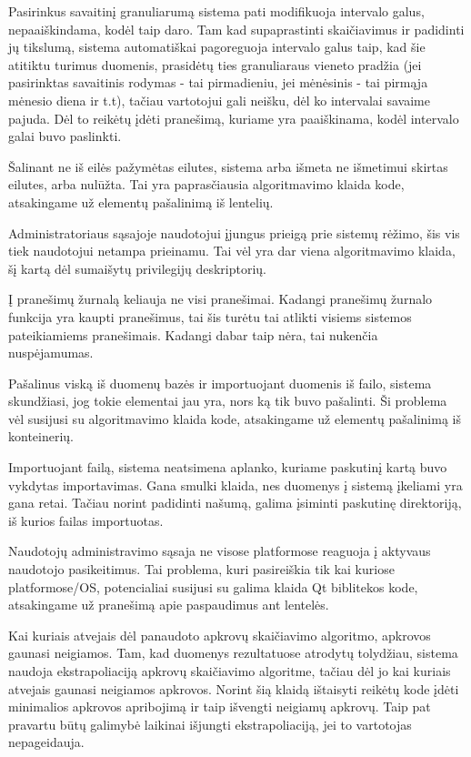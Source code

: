 {
  Pasirinkus savaitinį granuliarumą sistema pati modifikuoja intervalo galus,
  nepaaiškindama, kodėl taip daro.
}
{
  Tam kad supaprastinti skaičiavimus ir padidinti jų tikslumą, sistema automatiškai
  pagoreguoja intervalo galus taip, kad šie atitiktu turimus duomenis, prasidėtų ties 
  granuliaraus vieneto pradžia (jei pasirinktas savaitinis rodymas - tai pirmadieniu,
  jei mėnėsinis - tai pirmąja mėnesio diena ir t.t), tačiau vartotojui gali neišku, dėl
  ko intervalai savaime pajuda. Dėl to reikėtų įdėti pranešimą, kuriame yra paaiškinama,
  kodėl intervalo galai buvo paslinkti.
}

{
  Šalinant ne iš eilės pažymėtas eilutes, sistema arba išmeta ne išmetimui
  skirtas eilutes, arba nulūžta.
}
{
  Tai yra paprasčiausia algoritmavimo klaida kode, atsakingame už elementų pašalinimą
  iš lentelių.
}

{
  Administratoriaus sąsajoje naudotojui įjungus prieigą prie sistemų
  rėžimo, šis vis tiek naudotojui netampa prieinamu.
}
{
  Tai vėl yra dar viena algoritmavimo klaida, šį kartą dėl sumaišytų privilegijų deskriptorių.
}

{
  Į pranešimų žurnalą keliauja ne visi pranešimai.
}
{
  Kadangi pranešimų žurnalo funkcija yra kaupti pranešimus, tai šis turėtu tai atlikti
  visiems sistemos pateikiamiems pranešimais. Kadangi dabar taip nėra, tai nukenčia
  nuspėjamumas.
}

{
  Pašalinus viską iš duomenų bazės ir importuojant duomenis iš failo,
  sistema skundžiasi, jog tokie elementai jau yra, nors ką tik buvo pašalinti.
}
{
  Ši problema vėl susijusi su algoritmavimo klaida kode, atsakingame už elementų pašalinimą
  iš konteinerių.
}

{
  Importuojant failą, sistema neatsimena aplanko, kuriame paskutinį
  kartą buvo vykdytas importavimas.
}
{
  Gana smulki klaida, nes duomenys į sistemą įkeliami yra gana retai. Tačiau norint
  padidinti našumą, galima įsiminti paskutinę direktoriją, iš kurios failas importuotas.
}

{
  Naudotojų administravimo sąsaja ne visose platformose reaguoja į
  aktyvaus naudotojo pasikeitimus.
}
{
  Tai problema, kuri pasireiškia tik kai kuriose platformose/OS, potencialiai susijusi
  su galima klaida Qt biblitekos kode, atsakingame už pranešimą apie paspaudimus ant 
  lentelės.
}

{
  Kai kuriais atvejais dėl panaudoto apkrovų skaičiavimo algoritmo,
  apkrovos gaunasi neigiamos.
}
{
  Tam, kad duomenys rezultatuose atrodytų tolydžiau, sistema naudoja ekstrapoliaciją
  apkrovų skaičiavimo algoritme, tačiau dėl jo kai kuriais atvejais gaunasi neigiamos
  apkrovos. Norint šią klaidą ištaisyti reikėtų kode įdėti minimalios apkrovos apribojimą ir
  taip išvengti neigiamų apkrovų. Taip pat pravartu būtų galimybė laikinai išjungti
  ekstrapoliaciją, jei to vartotojas nepageidauja.
}




